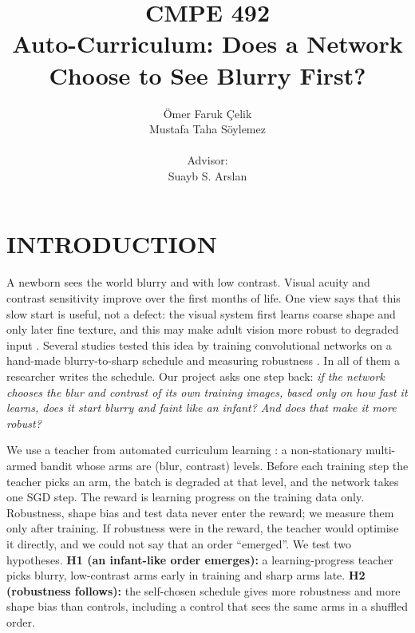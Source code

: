 \documentclass[a4paper,12pt]{report}
\begin{document}
\title{CMPE 492 \\ Auto-Curriculum: Does a Network \\ Choose to See Blurry First?}
\author{
Ömer Faruk Çelik \\
Mustafa Taha Söylemez \\ \\
Advisor: \\
Suayb S. Arslan
}
\date{}
\maketitle{}
\tableofcontents

\chapter{INTRODUCTION}

A newborn sees the world blurry and with low contrast. Visual acuity and contrast sensitivity improve over the first months of life. One view says that this slow start is useful, not a defect: the visual system first learns coarse shape and only later fine texture, and this may make adult vision more robust to degraded input \cite{vogelsang2018}. Several studies tested this idea by training convolutional networks on a hand-made blurry-to-sharp schedule and measuring robustness \cite{vogelsang2018,jang2021blurry,arslan2024noise}. In all of them a researcher writes the schedule. Our project asks one step back: \emph{if the network chooses the blur and contrast of its own training images, based only on how fast it learns, does it start blurry and faint like an infant? And does that make it more robust?}

We use a teacher from automated curriculum learning \cite{graves2017}: a non-stationary multi-armed bandit whose arms are (blur, contrast) levels. Before each training step the teacher picks an arm, the batch is degraded at that level, and the network takes one SGD step. The reward is learning progress on the training data only. Robustness, shape bias and test data never enter the reward; we measure them only after training. If robustness were in the reward, the teacher would optimise it directly, and we could not say that an order ``emerged''. We test two hypotheses. \textbf{H1 (an infant-like order emerges):} a learning-progress teacher picks blurry, low-contrast arms early in training and sharp arms late. \textbf{H2 (robustness follows):} the self-chosen schedule gives more robustness and more shape bias than controls, including a control that sees the same arms in a shuffled order.
\end{document}
